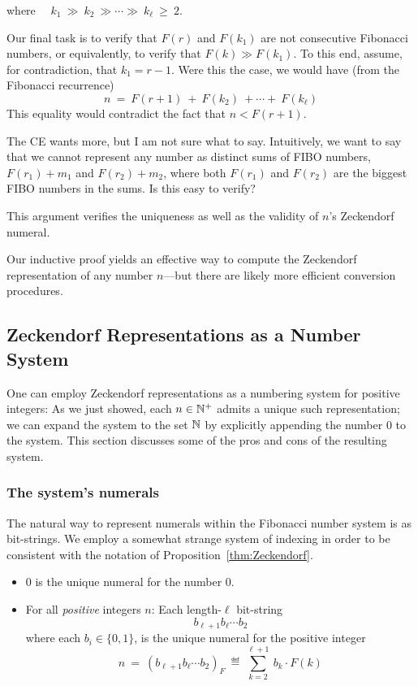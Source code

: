 \smallskip

\noindent
where \ \ $k_1 \ \gg \ k_2 \ \gg \cdots \gg \ k_\ell \ \geq \ 2$.

\smallskip 

Our final task is to verify that $F(r)$ and $F(k_1)$ are not consecutive Fibonacci numbers, or equivalently, to verify that $F(k) \gg F(k_1)$.  To this end, assume, for contradiction, that $k_1=r-1$.  Were this the case, we would have (from the Fibonacci recurrence)
\[ n \ = \ F(r+1) \ + \ F(k_2) \ + \cdots + \ F(k_\ell) \]
This equality would contradict the fact that $n < F(r+1)$.

\smallskip

{\Arny The CE wants more, but I am not sure what to say.  Intuitively, we want to say that we cannot represent any number as distinct sums of FIBO numbers,
$F(r_1) + m_1$ and $F(r_2) + m_2$, where both $F(r_1)$ and $F(r_2)$ are the biggest FIBO numbers in the sums.  Is this easy to verify?}

This argument verifies the uniqueness as well as the validity of $n$'s Zeckendorf numeral.

\medskip

Our inductive proof yields an effective way to compute the Zeckendorf representation of any number $n$---but there are likely more efficient conversion procedures.

\subsection{Zeckendorf Representations as a Number System}
\label{sec:Zeck-rep-number-system}

One can employ Zeckendorf representations as a numbering system for positive integers:  As we just showed, each $n \in \mathbb{N}^+$ admits a unique such representation; we can expand the system to the set $\mathbb{N}$ by explicitly appending the number $0$ to the system.  This section discusses some of the pros and cons of the resulting system.


\subsubsection{The system's numerals}

The natural way to represent numerals within the Fibonacci number system is as bit-strings.  We employ a somewhat strange system of indexing in order to be consistent with the notation of Proposition~\ref{thm:Zeckendorf}.
\begin{itemize}
\item
$0$ is the unique numeral for the number $0$.
\item
For all {\em positive} integers $n$: Each length-$\ell$ bit-string
\[ b_{\ell+1} b_{\ell} \cdots b_2 \]
where each $b_i \in \{0,1\}$, is the unique numeral for the positive integer
\[ n \ = \ (b_{\ell+1} b_\ell \cdots b_2)_F \ \eqdef \  \sum_{k=2}^{\ell+1} \ b_k \cdot F(k) \]
\end{itemize}


